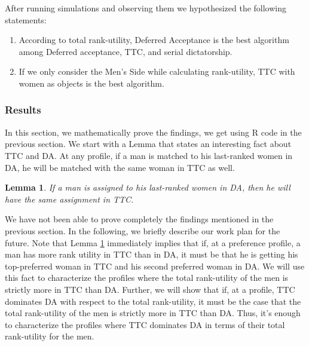 \documentclass[a4paper,11pt,table]{article}
\newtheorem{lemma}{Lemma}
\theoremstyle{definition}
\theoremstyle{remark}
\begin{document}
    After running simulations and observing them we hypothesized the following statements:
    \begin{enumerate}
        \item According to total rank-utility, Deferred Acceptance is the best algorithm among Deferred acceptance, TTC, and serial dictatorship.
        \item If we only consider the Men’s Side while calculating rank-utility, TTC with women as objects is the best algorithm.
    \end{enumerate}

    
\subsubsection{Results}

In this section, we mathematically prove the findings, we get using R code in the previous section. We start with a Lemma that states an interesting fact about TTC and DA. At any profile, if a man is matched to his  last-ranked women in DA, he will be matched with the same woman in TTC as well.  

\begin{lemma}\label{lem_1}
 If a man is assigned to his last-ranked
 women in DA, then he will have the same assignment in TTC.
 \end{lemma}
    

We have not been able to prove completely the findings mentioned in the previous section. In the following, we briefly describe our work plan for the future. Note that Lemma \ref{lem_1} immediately implies that if, at a preference profile, a man has more rank utility in TTC than in DA, it must be that he is getting his top-preferred woman in TTC and his second preferred woman in DA. We will use this fact to characterize the profiles where the total rank-utility of the men is strictly more in TTC than DA. Further, we will show that if, at a profile, TTC dominates DA with respect to the total rank-utility, it must be the case that the total rank-utility of the men is strictly more in TTC than DA. Thus, it's enough to characterize the profiles where TTC dominates DA in terms of their total rank-utility for the men. 
 



    
    
\end{document}
